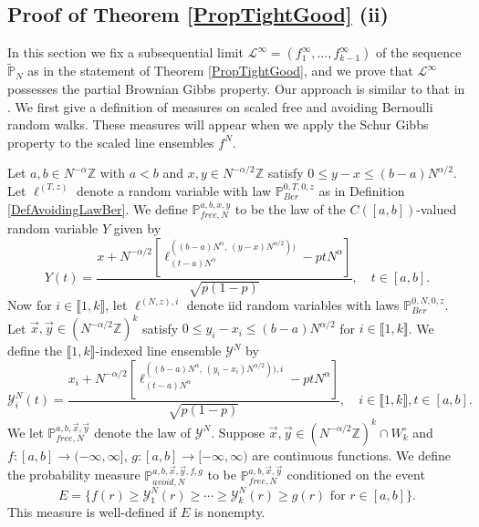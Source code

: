 \subsection{Proof of Theorem \ref{PropTightGood} (ii)}\label{Section4.3}

In this section we fix a subsequential limit $\mathcal{L}^\infty = (f_1^\infty,\dots,f_{k-1}^\infty)$ of the sequence $\tilde{\mathbb{P}}_N$ as in the statement of Theorem \ref{PropTightGood}, and we prove that $\mathcal{L}^\infty$ possesses the partial Brownian Gibbs property. Our approach is similar to that in \cite[Sections 5.1 and 5.2]{DimMat}. We first give a definition of measures on scaled free and avoiding Bernoulli random walks. These measures will appear when we apply the Schur Gibbs property to the scaled line ensembles $f^N$. 

\begin{definition}\label{scaledRW}
	Let $a,b\in N^{-\alpha}\mathbb{Z}$ with $a<b$ and $x,y\in N^{-\alpha/2}\mathbb{Z}$ satisfy $0\leq y-x \leq (b-a)N^{\alpha/2}$. Let $\ell^{(T,z)}$ denote a random variable with law $\mathbb{P}^{0,T,0,z}_{Ber}$ as in Definition \ref{DefAvoidingLawBer}. We define $\mathbb{P}^{a,b,x,y}_{free,N}$ to be the law of the $C([a,b])$-valued random variable $Y$ given by
	\[
	Y(t) = \frac{x + N^{-\alpha/2}\left[\ell^{((b-a)N^\alpha,\,(y-x)N^{\alpha/2}))}_{(t-a)N^\alpha} - ptN^\alpha\right]}{\sqrt{p(1-p)}}, \quad t\in [a,b].
	\]
	Now for $i\in\llbracket 1,k\rrbracket$, let $\ell^{(N,z),i}$ denote iid random variables with laws $\mathbb{P}^{0,N,0,z}_{Ber}$. Let $\vec{x},\vec{y}\in(N^{-\alpha/2}\mathbb{Z})^k$ satisfy $0\leq y_i-x_i \leq (b-a)N^{\alpha/2}$ for $i\in\llbracket 1,k\rrbracket$. We define the $\llbracket 1,k\rrbracket$-indexed line ensemble $\mathcal{Y}^N$ by
	\[
	\mathcal{Y}^N_i(t) = \frac{x_i + N^{-\alpha/2}\left[\ell^{((b-a)N^\alpha,\,(y_i-x_i)N^{\alpha/2})),i}_{(t-a)N^\alpha} - ptN^\alpha\right]}{\sqrt{p(1-p)}}, \quad i\in\llbracket 1,k\rrbracket, t\in [a,b].
	\]
	We let $\mathbb{P}^{a,b,\vec{x},\vec{y}}_{free,N}$ denote the law of $\mathcal{Y}^N$. Suppose $\vec{x},\vec{y}\in (N^{-\alpha/2}\mathbb{Z})^k\cap W_k^\circ$ and $f : [a,b] \to (-\infty,\infty]$, $g:[a,b]\to [-\infty,\infty)$ are continuous functions. We define the probability measure $\mathbb{P}^{a,b,\vec{x},\vec{y},f,g}_{avoid,N}$ to be $\mathbb{P}^{a,b,\vec{x},\vec{y}}_{free,N}$ conditioned on the event
	\[
	E = \{f(r) \geq \mathcal{Y}^N_1(r) \geq \cdots \geq \mathcal{Y}^N_k(r) \geq g(r) \mbox{ for } r\in[a,b]\}.
	\]
	This measure is well-defined if $E$ is nonempty.
	
\end{definition}

